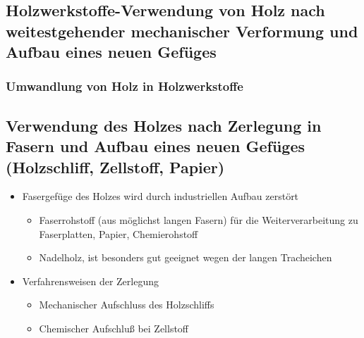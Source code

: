 \documentclass[12pt]{article}
\begin{document}
\subsection{Holzwerkstoffe-Verwendung von Holz nach weitestgehender
mechanischer Verformung und Aufbau eines neuen Gefüges}
\subsubsection{Umwandlung von Holz in Holzwerkstoffe}
\subsection{Verwendung des Holzes nach Zerlegung in Fasern und Aufbau eines
neuen Gefüges (Holzschliff, Zellstoff, Papier)}
\begin{itemize}
  \item Fasergefüge des Holzes wird durch industriellen Aufbau zerstört
  \begin{itemize}
    \item Faserrohstoff (aus möglichst langen Fasern) für die Weiterverarbeitung
    zu Faserplatten, Papier, Chemierohstoff
    \item Nadelholz, ist besonders gut geeignet wegen der langen Tracheichen
  \end{itemize}
  \item Verfahrensweisen der Zerlegung
  \begin{itemize}
    \item Mechanischer Aufschluss des Holzschliffs
    \item Chemischer Aufschluß bei Zellstoff
    \end{itemize}
\end{itemize}
\end{document}
